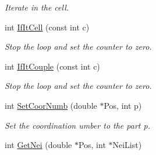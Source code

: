 \begin{DoxyCompactItemize}
\begin{DoxyCompactList}\small\item\em \-Iterate in the cell. \end{DoxyCompactList}\item 
int \hyperlink{classDdLinkedList_a7389c3097a5406135ae60ac38ad141f5}{\-If\-It\-Cell} (const int c)
\begin{DoxyCompactList}\small\item\em \-Stop the loop and set the counter to zero. \end{DoxyCompactList}\item 
int \hyperlink{classDdLinkedList_a3896db13faf370f18b2a70c6acd01930}{\-If\-It\-Couple} (const int c)
\begin{DoxyCompactList}\small\item\em \-Stop the loop and set the counter to zero. \end{DoxyCompactList}\item 
int \hyperlink{classDdLinkedList_ab8ed71a5fc65abc128da0367f93803c1}{\-Set\-Coor\-Numb} (double $\ast$\-Pos, int p)
\begin{DoxyCompactList}\small\item\em \-Set the coordination umber to the part p. \end{DoxyCompactList}\item 
\hypertarget{classDdLinkedList_afe0e4e9746cdae570f8c1efdfd04ac16}{int \hyperlink{classDdLinkedList_afe0e4e9746cdae570f8c1efdfd04ac16}{\-Get\-Nei} (double $\ast$\-Pos, int $\ast$\-Nei\-List)}\label{classDdLinkedList_afe0e4e9746cdae570f8c1efdfd04ac16}


\end{DoxyCompactItemize}
